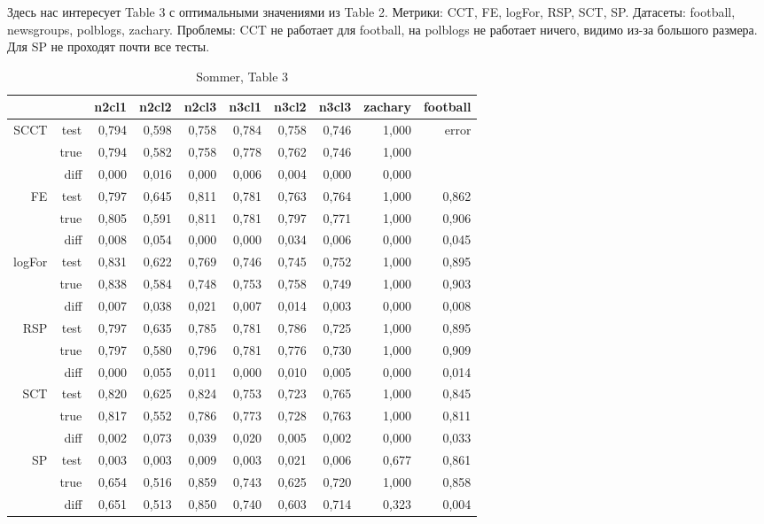 \documentclass{article}
\begin{document}
Здесь нас интересует Table 3 с оптимальными значениями из Table 2.
Метрики: CCT, FE, logFor, RSP, SCT, SP.
Датасеты: football, newsgroups, polblogs, zachary.
Проблемы: CCT не работает для football, на polblogs не работает ничего, видимо из-за большого размера. Для SP не проходят почти все тесты.

\begin{table}[H]
\centering
\caption{Sommer, Table 3}
\label{my-label}
\begin{tabular}{rr|rrrrrrrr}
       &      & n2cl1 & n2cl2 & n2cl3 & n3cl1 & n3cl2 & n3cl3 & zachary & football \\
       \hline
SCCT   & test & 0,794 & 0,598 & 0,758 & 0,784 & 0,758 & 0,746 & 1,000   & \cellcolor{red!25} error    \\
       & true & 0,794 & 0,582 & 0,758 & 0,778 & 0,762 & 0,746 & 1,000   &          \\
       & diff & 0,000 & 0,016 & 0,000 & 0,006 & 0,004 & 0,000 & 0,000   &          \\
       \cline{2-10}
FE     & test & 0,797 & 0,645 & 0,811 & 0,781 & 0,763 & 0,764 & 1,000   & 0,862    \\
       & true & 0,805 & 0,591 & 0,811 & 0,781 & 0,797 & 0,771 & 1,000   & 0,906    \\
       & diff & 0,008 & 0,054 & 0,000 & 0,000 & 0,034 & 0,006 & 0,000   & 0,045    \\
       \cline{2-10}
logFor & test & 0,831 & 0,622 & 0,769 & 0,746 & 0,745 & 0,752 & 1,000   & 0,895    \\
       & true & 0,838 & 0,584 & 0,748 & 0,753 & 0,758 & 0,749 & 1,000   & 0,903    \\
       & diff & 0,007 & 0,038 & 0,021 & 0,007 & 0,014 & 0,003 & 0,000   & 0,008    \\
       \cline{2-10}
RSP    & test & 0,797 & 0,635 & 0,785 & 0,781 & 0,786 & 0,725 & 1,000   & 0,895    \\
       & true & 0,797 & 0,580 & 0,796 & 0,781 & 0,776 & 0,730 & 1,000   & 0,909    \\
       & diff & 0,000 & 0,055 & 0,011 & 0,000 & 0,010 & 0,005 & 0,000   & 0,014    \\
       \cline{2-10}
SCT    & test & 0,820 & 0,625 & 0,824 & 0,753 & 0,723 & 0,765 & 1,000   & 0,845    \\
       & true & 0,817 & 0,552 & 0,786 & 0,773 & 0,728 & 0,763 & 1,000   & 0,811    \\
       & diff & 0,002 & 0,073 & 0,039 & 0,020 & 0,005 & 0,002 & 0,000   & 0,033    \\
       \cline{2-10}
SP     & test & 0,003 & 0,003 & 0,009 & 0,003 & 0,021 & 0,006 & 0,677   & 0,861    \\
       & true & 0,654 & 0,516 & 0,859 & 0,743 & 0,625 & 0,720 & 1,000   & 0,858    \\
       & diff & \cellcolor{red!25} 0,651 & \cellcolor{red!25} 0,513 & \cellcolor{red!25} 0,850 &
                    \cellcolor{red!25} 0,740 & \cellcolor{red!25} 0,603 & \cellcolor{red!25} 0,714 & \cellcolor{yellow!25} 0,323   & 0,004   
\end{tabular}
\end{table}
\end{document}

